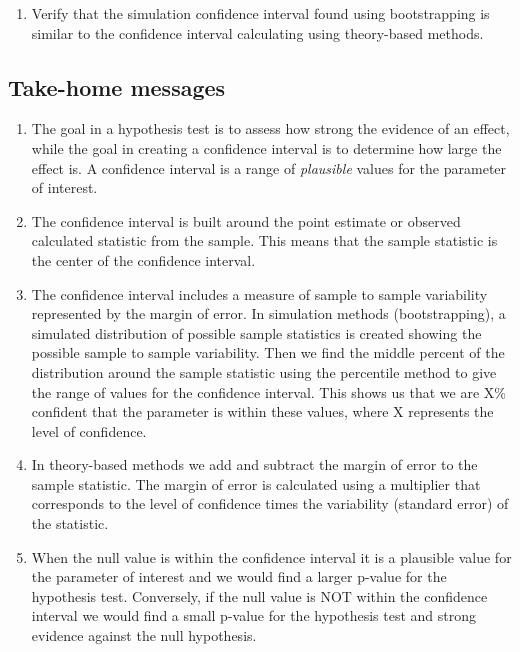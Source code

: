\documentclass[
]{report}
\providecommand{\tightlist}{%
  \setlength{\itemsep}{0pt}\setlength{\parskip}{0pt}}
\begin{document}
\vspace{1in}

\begin{enumerate}
\def\labelenumi{\arabic{enumi}.}
\setcounter{enumi}{3}
\tightlist
\item
  Verify that the simulation confidence interval found using bootstrapping is similar to the confidence interval calculating using theory-based methods.
\end{enumerate}

\vspace{1in}

\hypertarget{take-home-messages-6}{%
\subsection{Take-home messages}\label{take-home-messages-6}}

\begin{enumerate}
\def\labelenumi{\arabic{enumi}.}
\item
  The goal in a hypothesis test is to assess how strong the evidence of an effect, while the goal in creating a confidence interval is to determine how large the effect is. A confidence interval is a range of \emph{plausible} values for the parameter of interest.
\item
  The confidence interval is built around the point estimate or observed calculated statistic from the sample. This means that the sample statistic is the center of the confidence interval.
\item
  The confidence interval includes a measure of sample to sample variability represented by the margin of error. In simulation methods (bootstrapping), a simulated distribution of possible sample statistics is created showing the possible sample to sample variability. Then we find the middle percent of the distribution around the sample statistic using the percentile method to give the range of values for the confidence interval. This shows us that we are X\% confident that the parameter is within these values, where X represents the level of confidence.
\item
  In theory-based methods we add and subtract the margin of error to the sample statistic. The margin of error is calculated using a multiplier that corresponds to the level of confidence times the variability (standard error) of the statistic.
\item
  When the null value is within the confidence interval it is a plausible value for the parameter of interest and we would find a larger p-value for the hypothesis test. Conversely, if the null value is NOT within the confidence interval we would find a small p-value for the hypothesis test and strong evidence against the null hypothesis.
\end{enumerate}
\end{document}
